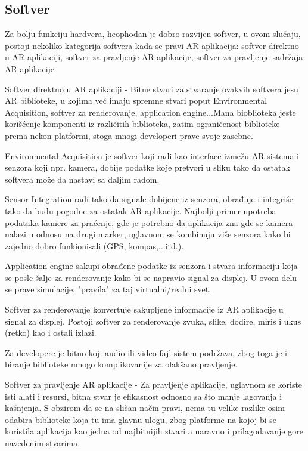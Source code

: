 \documentclass[a4paper]{article}
\begin{document}
	\subsection{Softver}
        \label{sec:Softver}
        Za bolju funkciju hardvera, heophodan je dobro razvijen softver, u ovom slučaju, postoji nekoliko kategorija softvera kada se pravi AR aplikacija: softver
	direktno u AR aplikaciji, softver za pravljenje AR aplikacije, softver za pravljenje sadržaja AR aplikacije
        
	Softver direktno u AR aplikaciji - Bitne stvari za stvaranje ovakvih softvera jesu AR biblioteke, u kojima već imaju spremne stvari poput Environmental
	Acquisition, softver za renderovanje, application engine...Mana bioblioteka jeste korišćenje komponenti iz različitih biblioteka, zatim ograničenost biblioteke
	prema nekon platformi, stoga mnogi developeri prave svoje zasebne.

	Environmental Acquisition je softver koji radi kao interface izmežu AR sistema i senzora koji npr. kamera, dobije podatke koje pretvori u sliku tako da ostatak
	softvera može da nastavi sa daljim radom.

	Sensor Integration radi tako da signale dobijene iz senzora, obrađuje i integriše tako da budu pogodne za ostatak AR aplikacije. Najbolji primer upotreba
	podataka kamere za praćenje, gde je potrebno da aplikacija zna gde se kamera nalazi u odnosu na drugi marker, uglavnom se kombinuju više senzora kako bi
	zajedno dobro funkionisali (GPS, kompas,...itd.).

	Application engine sakupi obrađene podatke iz senzora i stvara informaciju koja se posle šalje za renderovanje kako bi se napravio signal za displej. U ovom 
	delu se prave simulacije, "pravila" za taj virtualni/realni svet.

	Softver za renderovanje konvertuje sakupljene informacije iz AR aplikacije u signal za displej. Postoji softver za renderovanje zvuka, slike, dodire, miris i 
	ukus (retko) kao i ostali izlazi.

	Za developere je bitno koji audio ili video fajl sistem podržava, zbog toga je i biranje biblioteke mnogo komplikovanije za olakšano pravljenje.

	Softver za pravljenje AR aplikacije - Za pravljenje aplikacije, uglavnom se koriste isti alati i resursi, bitna stvar je efikasnost odnosno sa što manje 
	lagovanja i kašnjenja. S obzirom da se na sličan način pravi, nema tu velike razlike osim odabira biblioteke koja tu ima glavnu ulogu, zbog platforme na kojoj 
	bi se koristila aplikacija kao jedna od najbitnijih stvari a naravno i prilagođavanje gore navedenim stvarima.
\end{document}
